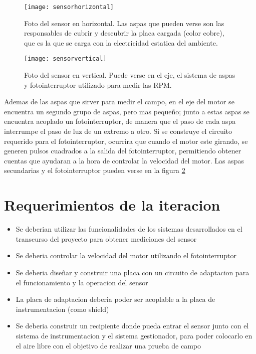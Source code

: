 \begin{figure}[h]
  \centering
  \texttt{[image: sensorhorizontal]}
  \caption[Imagen del sensor de campo electrostatico utilizado (horizontal)]{Foto del sensor en horizontal. Las aspas que pueden verse son las responsables de cubrir y descubrir la placa cargada (color cobre), que es la que se carga con la electricidad estatica del ambiente.}\label{fig:sensorhorizontal}
\end{figure}

\begin{figure}[h]
  \centering
  \texttt{[image: sensorvertical]}
  \caption[Imagen del sensor de campo electrostatico utilizado (vertical)]{Foto del sensor en vertical. Puede verse en el eje, el sistema de aspas y fotointerruptor utilizado para medir las RPM.}\label{fig:sensorvertical}
\end{figure}

Ademas de las aspas que sirver para medir el campo, en el eje del motor se encuentra un segundo grupo de aspas, pero mas pequeño; junto a estas aspas se encuentra acoplado un fotointerruptor, de manera que el paso de cada aspa interrumpe el paso de luz de un extremo a otro. Si se construye el circuito requerido para el fotointerruptor, ocurrira que cuando el motor este girando, se generen pulsos cuadrados a la salida del fotointerruptor, permitiendo obtener cuentas que ayudaran a la hora de controlar la velocidad del motor. Las aspas secundarias y el fotointerruptor pueden verse en la figura \ref{fig:sensorvertical}



\section{Requerimientos de la iteracion} %
\label{sec:requerimientos_de_la_iteracion}

\begin{itemize}
\item Se deberian utilizar las funcionalidades de los sistemas desarrollados en el transcurso del proyecto para obtener mediciones del sensor
\item Se deberia controlar la velocidad del motor utilizando el fotointerruptor
\item Se deberia diseñar y construir una placa con un circuito de adaptacion para el funcionamiento y la operacion del sensor
\item La placa de adaptacion deberia poder ser acoplable a la placa de instrumentacion (como shield)
\item Se deberia construir un recipiente donde pueda entrar el sensor junto con el sistema de instrumentacion y el sistema gestionador, para poder colocarlo en el aire libre con el objetivo de realizar una prueba de campo
\end{itemize}


